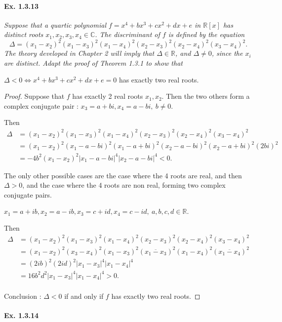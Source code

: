 \documentclass[11pt,a4paper]{article}
\newcommand{\R}{\mathbb{R}}
\newcommand{\C}{\mathbb{C}}
\begin{document}
\paragraph{Ex. 1.3.13}

{\it Suppose that a quartic polynomial $f = x^4+bx^3+cx^2+dx+e$ in $\R[x]$ has distinct roots $x_1,x_2,x_3,x_4 \in \C$. The discriminant of $f$ is defined by the equation
$$\Delta = (x_1-x_2)^2(x_1-x_3)^2(x_1-x_4)^2(x_2-x_3)^2(x_2-x_4)^2(x_3-x_4)^2.$$
The theory developed in Chapter 2 will imply that $\Delta \in \R$, and $\Delta \neq 0$, since the $x_i$ are distinct. Adapt the proof of Theorem 1.3.1 to show that

$\Delta<0 \iff x^4+bx^3+cx^2+dx+e = 0$ has exactly two real roots.
}

\begin{proof}
Suppose that $f$ has exactly 2 real roots $x_1,x_2$. Then the two others form a complex conjugate pair : $x_3 = a+bi, x_4 = a-bi, \ b\neq 0$.

Then
\begin{align*}
\Delta &= (x_1-x_2)^2 (x_1-x_3)^2 (x_1 - x_4)^2 (x_2-x_3)^2 (x_2-x_4)^2 (x_3-x_4)^2\\
&=(x_1-x_2)^2(x_1-a-bi)^2(x_1-a+bi)^2(x_2-a-bi)^2(x_2-a+bi)^2(2bi)^2\\
&=-4b^2(x_1-x_2)^2\vert x_1-a-bi\vert^4 \vert x_2 -a -bi \vert^4 <0.
\end{align*}

The only other possible cases are the case where the 4 roots are real, and then $\Delta >0$, and the case where the 4 roots are non real, forming two complex conjugate pairs.

$x_1 = a+ib, x_2 = a-ib, x_3= c+id, x_4 = c-id,\ a,b,c,d\in \mathbb{R}$.

Then
\begin{align*}
\Delta &= (x_1-x_2)^2 (x_1-x_3)^2 (x_1 - x_4)^2 (x_2-x_3)^2 (x_2-x_4)^2 (x_3-x_4)^2\\
&=(x_1-x_2)^2 (x_3-x_4)^2(x_1-x_3)^2(\overline{x_1-x_3})^2 (x_1-x_4)^2(\overline{x_1-x_4})^2\\
&=(2ib)^2(2id)^2 \vert x_1-x_3 \vert^4\vert x_1-x_4 \vert^4\\
&=16b^2d^2 \vert x_1-x_3 \vert^4\vert x_1-x_4 \vert^4 >0.\\
\end{align*}

Conclusion : $\Delta<0$ if and only if $f$ has exactly two real roots.
\end{proof}

\paragraph{Ex. 1.3.14}
\end{document}
